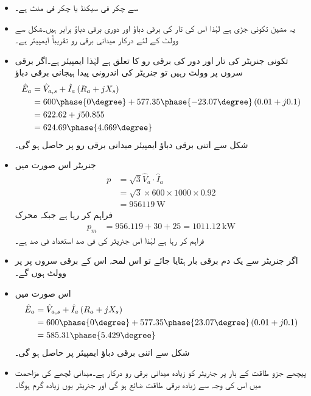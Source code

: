 \begin{itemize}
\item
{} سے  چکر فی سیکنڈ یا  چکر فی منٹ ہے۔
\item
یہ مشین تکونی جڑی ہے لہٰذا اس کی تار کی برقی دباؤ اور دوری برقی دباؤ برابر ہیں۔شکل   سے    وولٹ کے لئے درکار میدانی برقی رو تقریباً  ایمپیئر ہے۔
\item
تکونی جنریٹر کی تار اور دور کی برقی رو کا تعلق  ہے لہٰذا   ایمپیئر ہے۔اگر برقی سروں پر   وولٹ رہیں تو جنریٹر کی اندرونی پیدا ہیجانی  برقی دباؤ
\begin{align*}
\hat{E}_a&=\hat{V}_{a,s}+\hat{I}_a \left(R_a+j X_s \right)\\
&=600 \phase{0\degree} +577.35 \phase{-23.07\degree} \left(0.01+j 0.1 \right)\\
&=622.62+j 50.855\\
&=624.69\phase{4.669\degree}
\end{align*}
شکل سے اتنی برقی دباؤ  ایمپیئر میدانی برقی رو پر حاصل ہو گی۔
\item
جنریٹر اس صورت میں
\begin{align*}
p&=\sqrt{3} \hat{V}_{a} \cdot \hat{I}_a\\
&=\sqrt{3} \times 600 \times 1000 \times 0.92\\
&=\SI{956119}{\watt}
\end{align*}
فراہم کر رہا ہے جبکہ محرک 
\begin{align*}
p_m&=956.119+30+25=\SI{1011.12}{\kilo \watt}
\end{align*}
فراہم کر رہا ہے لہٰذا اس جنریٹر کی فی صد استعداد  فی صد ہے۔
\item
اگر جنریٹر سے یک دم برقی بار ہٹایا جائے تو اس لمحہ اس کے برقی سروں پر  پر  وولٹ ہوں گے۔
\item
اس صورت میں
\begin{align*}
\hat{E}_a&=\hat{V}_{a,s}+\hat{I}_a \left(R_a+j X_s \right)\\
&=600 \phase{0\degree} +577.35 \phase{23.07\degree} \left(0.01+j 0.1 \right)\\
&=585.31 \phase{5.429\degree}
\end{align*}
شکل   سے اتنی برقی دباؤ   ایمپیئر پر حاصل ہو گی۔
\item
پیچھے جزو طاقت کے بار پر جنریٹر کو زیادہ میدانی برقی رو درکار ہے۔میدانی لچھے کی مزاحمت میں اس کی وجہ سے زیادہ برقی طاقت ضائع ہو گی اور جنریٹر یوں زیادہ گرم ہوگا۔
\end{itemize}
